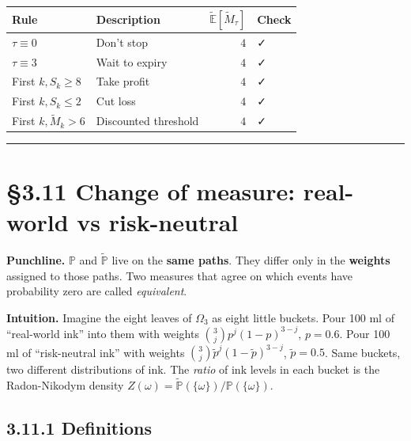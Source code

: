 \documentclass[
  10pt,
  twoside]{book}
\newcounter{none} %
\begin{document}
{\def\LTcaptype{none} %
\begin{table}[H]
\centering
\begin{tabular}{|l|l|r|l|}
\toprule
Rule & Description & \(\tilde{\mathbb E}[\widetilde M_\tau]\) & Check \\
\midrule



\(\tau \equiv 0\) & Don't stop & \(4\) & ✓ \\
\(\tau \equiv 3\) & Wait to expiry & \(4\) & ✓ \\
First \(k, S_k \ge 8\) & Take profit & \(4\) & ✓ \\
First \(k, S_k \le 2\) & Cut loss & \(4\) & ✓ \\
First \(k, \widetilde M_k > 6\) & Discounted threshold & \(4\) & ✓ \\
\bottomrule
\end{tabular}
\end{table}
}

\begin{center}\rule{0.5\linewidth}{0.5pt}\end{center}

\section{§3.11 Change of measure: real-world vs
risk-neutral}\label{change-of-measure-real-world-vs-risk-neutral}

\textbf{Punchline.} \(\mathbb P\) and \(\tilde{\mathbb P}\) live on the
\textbf{same paths}. They differ only in the \textbf{weights} assigned
to those paths. Two measures that agree on which events have probability
zero are called \emph{equivalent}.

\textbf{Intuition.} Imagine the eight leaves of \(\Omega_3\) as eight
little buckets. Pour 100 ml of ``real-world ink'' into them with weights
\(\binom{3}{j} p^j (1-p)^{3-j}\), \(p=0.6\). Pour 100 ml of
``risk-neutral ink'' with weights
\(\binom{3}{j} \tilde p^j (1-\tilde p)^{3-j}\), \(\tilde p = 0.5\). Same
buckets, two different distributions of ink. The \emph{ratio} of ink
levels in each bucket is the Radon-Nikodym density
\(Z(\omega) = \tilde{\mathbb P}(\{\omega\}) / \mathbb P(\{\omega\})\).

\subsection{3.11.1 Definitions}\label{definitions-13}
\end{document}
